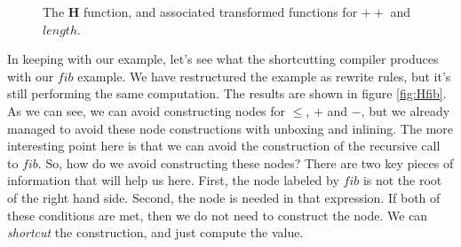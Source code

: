 \documentclass{book}
\theoremstyle{definition}
\newcommand{\Varid}[1]{\mathit{#1}}
\newcommand{\plus}{\mathbin{+\!\!\!+}}
\renewcommand{\leq}{\leqslant}
\def\resethooks{%
  \global\let\SaveRestoreHook\empty
  \global\let\ColumnHook\empty}
\begin{document}
\begin{figure}
\resethooks
\caption{The \textbf{H} function, and associated transformed functions for \ensuremath{\plus } and \ensuremath{\Varid{length}}.}
\label{fig:H}
\end{figure}

In keeping with our example,
let's see what the shortcutting compiler produces with our \ensuremath{\Varid{fib}} example.
We have restructured the example as rewrite rules, but it's still performing the same computation.
The results are shown in figure \ref{fig:Hfib}.
As we can see, we can avoid constructing nodes for \ensuremath{\leq }, \ensuremath{\mathbin{+}} and \ensuremath{\mathbin{-}},
but we already managed to avoid these node constructions with unboxing and inlining.
The more interesting point here is that we can avoid the construction of the recursive call to \ensuremath{\Varid{fib}}.
So, how do we avoid constructing these nodes?
There are two key pieces of information that will help us here.
First, the node labeled by \ensuremath{\Varid{fib}} is not the root of the right hand side.
Second, the node is needed in that expression.
If both of these conditions are met, then we do not need to construct the node.
We can \emph{shortcut} the construction, and just compute the value.
\end{document}
